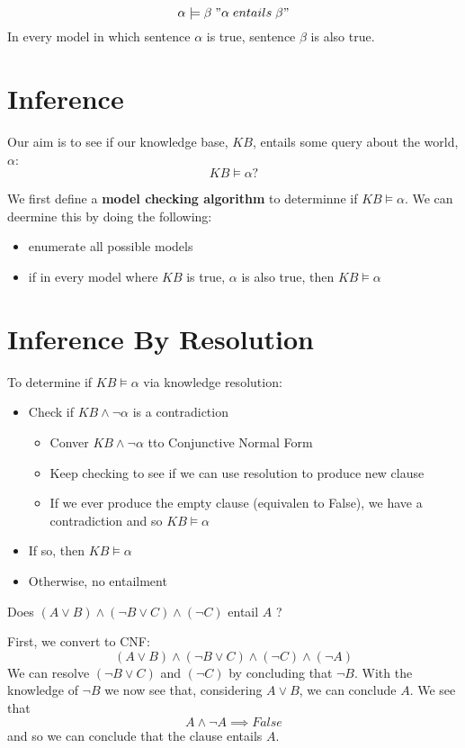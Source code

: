 \begin{definition}[Enatilment]
	\[
		\alpha \models \beta \; "\alpha \; entails \; \beta"
	\]
	In every model in which sentence \(\alpha \) is true, sentence \(\beta \) is also true.
\end{definition}

\section{Inference}
Our aim is to see if our knowledge base, \(KB\), entails some query about the world, \(\alpha\):
\[
	KB \models \alpha ?
\]  

We first define a \textbf{model checking algorithm} to determinne if \(KB \models \alpha \). We can deermine this by doing the following:
\begin{itemize}
	\item enumerate all possible models
	\item if in every model where \(KB\) is true, \(\alpha \) is also true, then \(KB \models \alpha \) 
\end{itemize}

\section{Inference By Resolution}
To determine if \(KB \models \alpha \) via knowledge resolution:
\begin{itemize}
	\item Check if \(KB \land \neg \alpha \) is a contradiction
	\begin{itemize}
		\item Conver \(KB \land \neg \alpha \) tto Conjunctive Normal Form
		\item Keep checking to see if we can use resolution to produce new clause
		\item If we ever produce the empty clause (equivalen to False), we have a contradiction and so \(KB \models \alpha \)
	\end{itemize}
	\item If so, then \(KB \models \alpha \)
	\item Otherwise, no entailment
\end{itemize}

\begin{problem}
	Does \((A \vee B) \land (\neg B \vee C) \land (\neg C)\) entail \(A\) ?
\end{problem}
\begin{answer}
	First, we convert to CNF:
	\[
		(A \vee B) \land (\neg B \vee C) \land (\neg C) \land (\neg A)
	\]
	We can resolve \((\neg B \vee C)\) and \((\neg C)\) by concluding that \(\neg B\). With the knowledge of \(\neg B\) we now see that, considering \(A \vee B\), we can conclude \(A\). We see that
	\[
		A \land \neg A \implies False
	\]
	and so we can conclude that the clause entails \(A\).
\end{answer} 